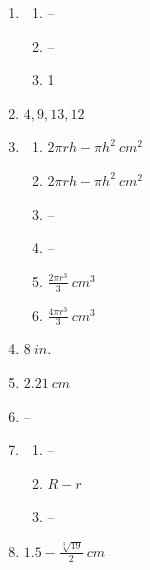 \documentclass{article}
\begin{document}
\begin{enumerate}
\begin{enumerate}
	\end{enumerate}
	
\item

	\begin{enumerate}
	
	\item --
	
	\item --
	
	\item 1
	
	\end{enumerate}
	
\item $4, 9, 13, 12$

\item

	\begin{enumerate}
	
	\item $2 \pi r h - \pi h^2 \ cm^2$
	
	\item $2 \pi r h - \pi h^2 \ cm^2$
	
	\item --
	
	\item --
	
	\item $\frac{2 \pi r^3}{3} \ cm^3 $
	
	\item $\frac{4 \pi r^3}{3} \ cm^3$
	
	\end{enumerate}
	
\item $8 \ in.$

\item $2.21 \ cm$

\item --

\item 

	\begin{enumerate}
	
	\item --
	
	\item $R - r$
	
	\item --
	
	\end{enumerate}
	
\item $1.5 - \frac{\sqrt[3]{19}}{2} \ cm$


\end{enumerate}
\end{document}
